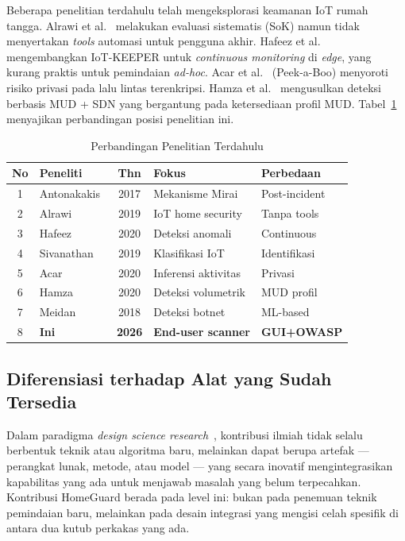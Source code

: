 \documentclass[conference]{IEEEtran}
\begin{document}
Beberapa penelitian terdahulu telah mengeksplorasi keamanan IoT rumah
tangga. Alrawi et al.\ \cite{alrawi2019} melakukan evaluasi sistematis
(SoK) namun tidak menyertakan \textit{tools} automasi untuk pengguna
akhir. Hafeez et al.\ \cite{hafeez2020} mengembangkan IoT-KEEPER untuk
\textit{continuous monitoring} di \textit{edge}, yang kurang praktis untuk
pemindaian \textit{ad-hoc}. Acar et al.\ \cite{acar2020} (Peek-a-Boo)
menyoroti risiko privasi pada lalu lintas terenkripsi. Hamza
et al.\ \cite{hamza2020} mengusulkan deteksi berbasis MUD + SDN yang
bergantung pada ketersediaan profil MUD. Tabel~\ref{tab:terdahulu}
menyajikan perbandingan posisi penelitian ini.

\begin{table}[htbp]
\caption{Perbandingan Penelitian Terdahulu}
\label{tab:terdahulu}
\renewcommand{\arraystretch}{1.2}
\begin{tabularx}{\columnwidth}{|c|l|c|X|X|}
\hline
\textbf{No} & \textbf{Peneliti} & \textbf{Thn} & \textbf{Fokus} & \textbf{Perbedaan} \\
\hline
1 & Antonakakis~\cite{antonakakis2017} & 2017 & Mekanisme Mirai & Post-incident \\
\hline
2 & Alrawi~\cite{alrawi2019} & 2019 & IoT home security & Tanpa tools \\
\hline
3 & Hafeez~\cite{hafeez2020} & 2020 & Deteksi anomali & Continuous \\
\hline
4 & Sivanathan~\cite{sivanathan2019} & 2019 & Klasifikasi IoT & Identifikasi \\
\hline
5 & Acar~\cite{acar2020} & 2020 & Inferensi aktivitas & Privasi \\
\hline
6 & Hamza~\cite{hamza2020} & 2020 & Deteksi volumetrik & MUD profil \\
\hline
7 & Meidan~\cite{meidan2018} & 2018 & Deteksi botnet & ML-based \\
\hline
8 & \textbf{Ini} & \textbf{2026} & \textbf{End-user scanner} & \textbf{GUI+OWASP} \\
\hline
\end{tabularx}
\end{table}

\subsection{Diferensiasi terhadap Alat yang Sudah Tersedia}

Dalam paradigma \textit{design science research}~\cite{hevner2004},
kontribusi ilmiah tidak selalu berbentuk teknik atau algoritma baru,
melainkan dapat berupa artefak --- perangkat lunak, metode, atau model
--- yang secara inovatif mengintegrasikan kapabilitas yang ada untuk
menjawab masalah yang belum terpecahkan. Kontribusi HomeGuard berada
pada level ini: bukan pada penemuan teknik pemindaian baru, melainkan
pada desain integrasi yang mengisi celah spesifik di antara dua kutub
perkakas yang ada.
\end{document}
